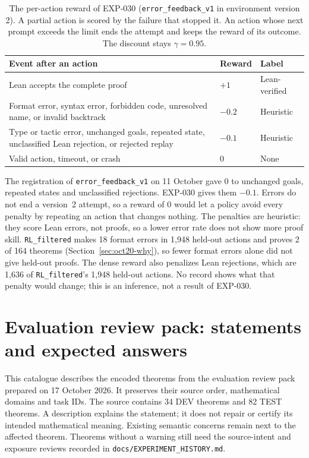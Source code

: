 \documentclass[11pt]{article}
\newcommand{\code}[1]{\texttt{#1}}
\newcommand{\pth}[1]{\nolinkurl{#1}}
\begin{document}
\begin{table}[!htbp]
\centering
\small
\caption{The per-action reward of EXP-030 (\code{error\_feedback\_v1} in environment version 2). A partial action is scored by the failure that stopped it. An action whose next prompt exceeds the limit ends the attempt and keeps the reward of its outcome. The discount stays $\gamma = 0.95$.}
\label{tab:dense-reward}
\begin{tabularx}{\textwidth}{@{}YP{1.6cm}P{2.4cm}@{}}
\toprule
Event after an action & Reward & Label \\
\midrule
Lean accepts the complete proof & $+1$ & Lean-verified \\
Format error, syntax error, forbidden code, unresolved name, or invalid backtrack & $-0.2$ & Heuristic \\
Type or tactic error, unchanged goals, repeated state, unclassified Lean rejection, or rejected replay & $-0.1$ & Heuristic \\
Valid action, timeout, or crash & $0$ & None \\
\bottomrule
\end{tabularx}
\end{table}

The registration of \code{error\_feedback\_v1} on 11 October gave 0 to unchanged goals, repeated states and unclassified rejections.
EXP-030 gives them $-0.1$.
Errors do not end a version~2 attempt, so a reward of 0 would let a policy avoid every penalty by repeating an action that changes nothing.
The penalties are heuristic: they score Lean errors, not proofs, so a lower error rate does not show more proof skill.
\code{RL\_filtered} makes 18 format errors in 1,948 held-out actions and proves 2 of 164 theorems (Section~\ref{sec:oct20-why}), so fewer format errors alone did not give held-out proofs.
The dense reward also penalizes Lean rejections, which are 1,636 of \code{RL\_filtered}'s 1,948 held-out actions.
No record shows what that penalty would change; this is an inference, not a result of EXP-030.

\clearpage
\section{Evaluation review pack: statements and expected answers}
\label{app:evaluation-questions}

This catalogue describes the encoded theorems from the evaluation review pack prepared on 17 October 2026.
It preserves their source order, mathematical domains and task IDs.
The source contains 34 DEV theorems and 82 TEST theorems.
A description explains the statement; it does not repair or certify its intended mathematical meaning.
Existing semantic concerns remain next to the affected theorem.
Theorems without a warning still need the source-intent and exposure reviews recorded in \pth{docs/EXPERIMENT_HISTORY.md}.
\end{document}
